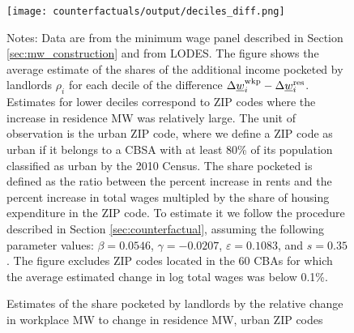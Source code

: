 \begin{figure}[h!]
    \centering
    \caption{Estimates of the share pocketed by landlords by the relative 
             change in workplace MW to change in residence MW, urban ZIP codes}
    \label{fig:rho_by_decile_MW_gap}

	\texttt{[image: counterfactuals/output/deciles\_diff.png]}

    \begin{minipage}{.95\textwidth} \footnotesize
        \vspace{3mm}
        Notes:
        Data are from the minimum wage panel described in 
        Section \ref{sec:mw_construction} and from LODES.
        The figure shows the average estimate of the shares of the additional 
        income pocketed by landlords $\rho_i$ for each decile of the 
        difference $\Delta \underline{w}_i^{\text{wkp}} - \Delta \underline{w}_i^{\text{res}}$.
        Estimates for lower deciles correspond to ZIP codes where the increase 
        in residence MW was relatively large.
        The unit of observation is the urban ZIP code, where we define a ZIP code 
        as urban if it belongs to a CBSA with at least 80\% of its population 
        classified as urban by the 2010 Census.
        The share pocketed is defined as the ratio between the percent increase 
        in rents and the percent increase in total wages multipled by the share 
        of housing expenditure in the ZIP code.
        To estimate it we follow the procedure described in Section 
        \ref{sec:counterfactual}, assuming the following parameter values: 
        $\beta = 0.0546$, $\gamma = -0.0207$, $\varepsilon = 0.1083$, and 
        $s = 0.35$.
        The figure excludes ZIP codes located in the 60 CBAs for which the average
        estimated change in log total wages was below 0.1\%.
    \end{minipage}
\end{figure}
